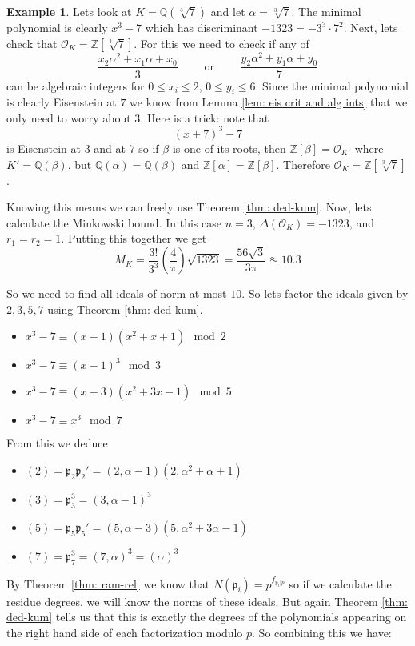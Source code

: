 \documentclass[11pt,a4paper]{report}
\theoremstyle{plain}
\theoremstyle{definition}
\newtheorem{exmp}[subsection]{Example}
\theoremstyle{definition}
\newcommand{\ZZ}{\mathbb{Z}}
\def\QQ{\mathbb{Q}}
\def\gothp{\mathfrak{p}}
\def \a{\alpha}
\def \OO {\mathcal{O}}
\begin{document}
	\begin{exmp}
		Lets look at $K=\QQ(\sqrt[3]{7})$ and let $\a=\sqrt[3]{7}$. The minimal polynomial is clearly $x^3-7$ which has discriminant $-1323=-3^3 \cdot7^2$. Next, lets check that $\OO_K=\ZZ[\sqrt[3]{7}]$. For this we need to check if any of \[\frac{x_2\a^2+x_1\a+x_0}{3} \qquad \text{ or } \qquad \frac{y_2\a^2+y_1\a+y_0}{7}\] can be algebraic integers for $0 \leq x_i \leq 2$, $0\leq y_i \leq 6$. Since the minimal polynomial is clearly Eisenstein at $7$ we know from Lemma \ref{lem: eis crit and alg ints} that we only need to worry about $3$. Here is a trick: note that \[(x+7)^3-7\] is Eisenstein at $3$ and at $7$ so if $\beta$ is one of its roots, then $\ZZ[\beta]=\OO_{K'}$ where $K'=\QQ(\beta)$, but $\QQ(\a)=\QQ(\beta)$ and $\ZZ[\a]=\ZZ[\beta]$. Therefore $\OO_K=\ZZ[\sqrt[3]{7}]$.
		
		Knowing this means we can freely use Theorem \ref{thm: ded-kum}. Now, lets calculate the Minkowski bound. In this case $n=3$, $\Delta(\OO_K)=-1323$, and $r_1=r_2=1$. Putting this together we get \[M_K=\frac{3!}{3^3}\left(\frac{4}{\pi}\right) \sqrt{1323}= \frac{56\sqrt{3}}{3\pi} \approxeq 10.3\]
		
		So we need to find all ideals of norm at most $10$. So lets factor the ideals given by $2,3,5,7$ using Theorem \ref{thm: ded-kum}.
		
		\begin{itemize}
			\item $x^3-7 \equiv (x-1)(x^2+x+1) \mod 2$
			\item $x^3-7 \equiv (x-1)^3 \mod 3$
			\item $x^3-7 \equiv (x-3)(x^2+3x-1) \mod 5$
			\item $x^3-7 \equiv x^3 \mod 7$
		\end{itemize}
		
		From this we deduce 
		
		\begin{itemize}
			\item $(2)=\gothp_2\gothp_2'=(2,\a-1)(2,\a^2+\a+1)$
			\item $(3)=\gothp_3^3=(3,\a-1)^3$
			\item $(5)=\gothp_5\gothp_5'=(5,\a-3)(5,\a^2+3\a-1)$
			\item $(7)=\gothp_7^3=(7,\a)^3=(\a)^3$
		\end{itemize}
		
		By Theorem \ref{thm: ram-rel} we know that $N({\gothp_i})=p^{f_{\gothp_i|p}}$ so if we calculate the residue degrees, we will know the norms of these ideals. But again Theorem \ref{thm: ded-kum} tells us that this is exactly the degrees of the polynomials appearing on the right hand side of each factorization modulo $p$. So combining this we have:
		

\end{exmp}
\end{document}
